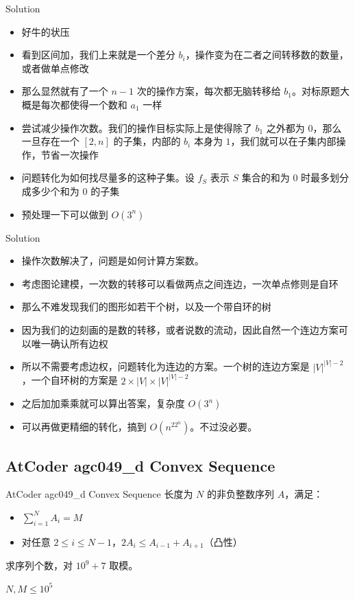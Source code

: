 ﻿\documentclass[aspectratio=169]{ctexbeamer}
\begin{document}
\begin{frame}{Solution}
    \begin{itemize}
        \item 好牛的状压
        \item 看到区间加，我们上来就是一个差分 $b_i$，操作变为在二者之间转移数的数量，或者做单点修改
        \item 那么显然就有了一个 $n-1$ 次的操作方案，每次都无脑转移给 $b_1$。对标原题大概是每次都使得一个数和 $a_1$ 一样
        \item 尝试减少操作次数。我们的操作目标实际上是使得除了 $b_1$ 之外都为 $ 0 $，那么一旦存在一个 $[2,n]$ 的子集，内部的 $b_i$ 本身为 $1$，我们就可以在子集内部操作，节省一次操作
        \item 问题转化为如何找尽量多的这种子集。设 $f_S$ 表示 $S$ 集合的和为 $ 0 $ 时最多划分成多少个和为 $ 0 $ 的子集
        \item 预处理一下可以做到 $O(3^n)$
    \end{itemize}
\end{frame}

\begin{frame}{Solution}
    \begin{itemize}
        \item 操作次数解决了，问题是如何计算方案数。
        \item 考虑图论建模，一次数的转移可以看做两点之间连边，一次单点修则是自环
        \item 那么不难发现我们的图形如若干个树，以及一个带自环的树
        \item 因为我们的边刻画的是数的转移，或者说数的流动，因此自然一个连边方案可以唯一确认所有边权
        \item 所以不需要考虑边权，问题转化为连边的方案。一个树的连边方案是 $|V|^{|V|-2}$，一个自环树的方案是 $2\times|V|\times|V|^{|V|-2}$
        \item 之后加加乘乘就可以算出答案，复杂度 $O(3^n)$
        \item 可以再做更精细的转化，搞到 $O(n^22^n)$。不过没必要。
    \end{itemize}
\end{frame}

\subsection{AtCoder agc049\_d Convex Sequence}
\begin{frame}{AtCoder agc049\_d Convex Sequence}
    长度为 $N$ 的非负整数序列 $A$，满足：
    \begin{itemize}
        \item $\displaystyle\sum_{i=1}^N A_i = M$
        \item 对任意 $2\le i\le N-1$，$2A_i \le A_{i-1}+A_{i+1}$（凸性）
    \end{itemize}
    求序列个数，对 $10^9+7$ 取模。
    
    $N,M\le 10^5$
\end{frame}
\end{document}
